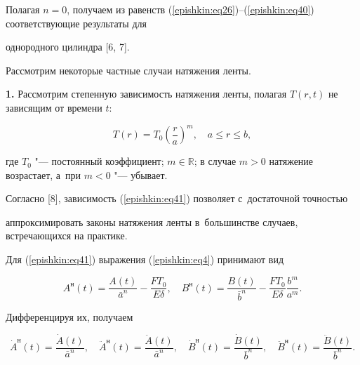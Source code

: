 Полагая $n=0$, получаем из равенств (\ref{epishkin:eq26})--(\ref{epishkin:eq40}) соответствующие результаты для 

однородного цилиндра [6, 7].



Рассмотрим некоторые частные случаи натяжения ленты.



\textbf{1.} Рассмотрим степенную зависимость натяжения ленты, полагая $T(r,t)$ не зависящим от времени $t$:

\begin{equation}

\label{epishkin:eq41}

T(r)=T_0\left( \frac ra \right)^m,\quad  a\le r\le b,

\end{equation}

где $T_0$ "--- постоянный коэффициент; $m\in \mathbb R$; в случае $m > 0$ натяжение возрастает, а~при $m <0$ "--- убывает.

Согласно [8], зависимость (\ref{epishkin:eq41}) позволяет с~достаточной точностью 

аппроксимировать законы натяжения ленты в~большинстве случаев, встречающихся на практике.





Для  (\ref{epishkin:eq41}) выражения (\ref{epishkin:eq4}) принимают вид

\begin{equation*}

 A^{\text{н}}(t)=\frac{A(t)}{\bar  a ^n}-\frac{F  T_0}{E  \delta }, \quad

 B^{\text{н}}(t)=\frac{B(t)}{\bar  b ^n}-\frac{F  T_0}{E  \delta }\frac{b^m}{a^m}.

\end{equation*}

Дифференцируя их, получаем

\begin{equation}

\label{epishkin:eq43}

 \dot {A}^{\text{н}}(t)=\frac{\dot {A}(t)}{\bar  a ^n}, \quad \ddot 

{A}^{\text{н}}(t)=\frac{\ddot {A}(t)}{\bar  a ^n}, \quad 

 \dot {B}^{\text{н}}(t)=\frac{\dot {B}(t)}{\bar  b ^n}, \quad  \ddot 

{B}^{\text{н}}(t)=\frac{\ddot {B}(t)}{\bar  b ^n} .

\end{equation}



